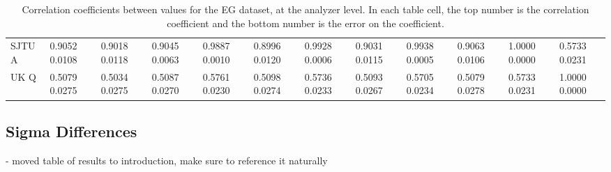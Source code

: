 \begin{landscape}
\begin{table}
\begin{tabularx}{1\linewidth}{@{\extracolsep{\fill}}lXXXXXXXXXXX}
	SJTU A & 0.9052 0.0108 & 0.9018 0.0118 & 0.9045 0.0063 & 0.9887 0.0010 & 0.8996 0.0120 & 0.9928 0.0006 & 0.9031 0.0115 & 0.9938 0.0005 & 0.9063 0.0106 & 1.0000 0.0000 & 0.5733 0.0231  \\
	UK Q   & 0.5079 0.0275 & 0.5034 0.0275 & 0.5087 0.0270 & 0.5761 0.0230 & 0.5098 0.0274 & 0.5736 0.0233 & 0.5093 0.0267 & 0.5705 0.0234 & 0.5079 0.0278 & 0.5733 0.0231 & 1.0000 0.0000  \\
  \bottomrule
\end{tabularx}
\caption[]{Correlation coefficients between \R values for the EG dataset, at the analyzer level. In each table cell, the top number is the correlation coefficient and the bottom number is the error on the coefficient.}
\label{tab:Corrs_EG_analyzer}
\end{table}
\end{landscape}



\subsection{Sigma Differences}


- moved table of results to introduction, make sure to reference it naturally


